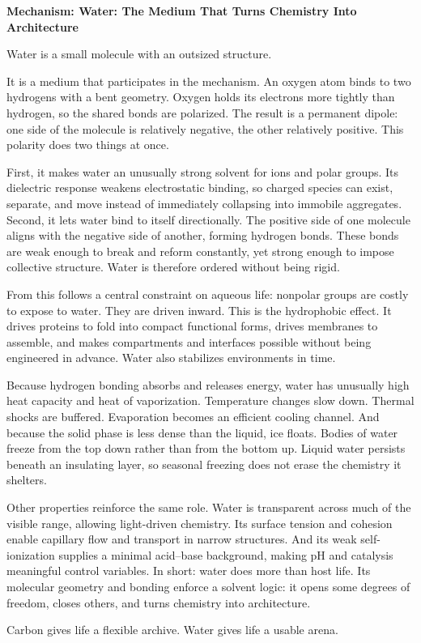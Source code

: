 \documentclass[11pt,twoside,openright]{book}
\newenvironment{mechanismbox}[1]
  {\begin{framed}\noindent\textbf{Mechanism: #1}\par\medskip}
  {\end{framed}}
\begin{document}
\begin{mechanismbox}{Water: The Medium That Turns Chemistry Into Architecture}
Water is a small molecule with an outsized structure.

It is a medium that participates in the mechanism. An oxygen atom binds to two hydrogens with a bent geometry. Oxygen holds its electrons more tightly than hydrogen, so the shared bonds are polarized. The result is a permanent dipole: one side of the molecule is relatively negative, the other relatively positive. This polarity does two things at once.

First, it makes water an unusually strong solvent for ions and polar groups. Its dielectric response weakens electrostatic binding, so charged species can exist, separate, and move instead of immediately collapsing into immobile aggregates. Second, it lets water bind to itself directionally. The positive side of one molecule aligns with the negative side of another, forming hydrogen bonds. These bonds are weak enough to break and reform constantly, yet strong enough to impose collective structure. Water is therefore ordered without being rigid.

From this follows a central constraint on aqueous life: nonpolar groups are costly to expose to water. They are driven inward. This is the hydrophobic effect. It drives proteins to fold into compact functional forms, drives membranes to assemble, and makes compartments and interfaces possible without being engineered in advance. Water also stabilizes environments in time.

Because hydrogen bonding absorbs and releases energy, water has unusually high heat capacity and heat of vaporization. Temperature changes slow down. Thermal shocks are buffered. Evaporation becomes an efficient cooling channel. And because the solid phase is less dense than the liquid, ice floats. Bodies of water freeze from the top down rather than from the bottom up. Liquid water persists beneath an insulating layer, so seasonal freezing does not erase the chemistry it shelters.

Other properties reinforce the same role. Water is transparent across much of the visible range, allowing light-driven chemistry. Its surface tension and cohesion enable capillary flow and transport in narrow structures. And its weak self-ionization supplies a minimal acid--base background, making pH and catalysis meaningful control variables. In short: water does more than host life. Its molecular geometry and bonding enforce a solvent logic: it opens some degrees of freedom, closes others, and turns chemistry into architecture.

Carbon gives life a flexible archive.
Water gives life a usable arena.
\end{mechanismbox}
\end{document}
